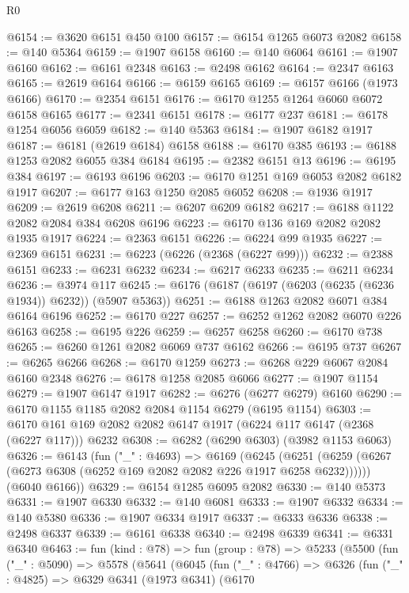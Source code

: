 \begin{lexlean}{R0}
\begin{coremodule}
@6154 := @3620 @6151 @450 @100
@6157 := @6154 @1265 @6073 @2082
@6158 := @140 @5364
@6159 := @1907 @6158
@6160 := @140 @6064
@6161 := @1907 @6160
@6162 := @6161 @2348
@6163 := @2498 @6162
@6164 := @2347 @6163
@6165 := @2619 @6164
@6166 := @6159 @6165
@6169 := @6157 @6166 (@1973 @6166)
@6170 := @2354 @6151
@6176 := @6170 @1255 @1264 @6060 @6072 @6158 @6165
@6177 := @2341 @6151
@6178 := @6177 @237
@6181 := @6178 @1254 @6056 @6059
@6182 := @140 @5363
@6184 := @1907 @6182 @1917
@6187 := @6181 (@2619 @6184) @6158
@6188 := @6170 @385
@6193 := @6188 @1253 @2082 @6055 @384 @6184
@6195 := @2382 @6151 @13
@6196 := @6195 @384
@6197 := @6193 @6196
@6203 := @6170 @1251 @169 @6053 @2082 @6182 @1917
@6207 := @6177 @163 @1250 @2085 @6052
@6208 := @1936 @1917
@6209 := @2619 @6208
@6211 := @6207 @6209 @6182
@6217 := @6188 @1122 @2082 @2084 @384 @6208 @6196
@6223 := @6170 @136 @169 @2082 @2082 @1935 @1917
@6224 := @2363 @6151
@6226 := @6224 @99 @1935
@6227 := @2369 @6151
@6231 := @6223 (@6226 (@2368 (@6227 @99)))
@6232 := @2388 @6151
@6233 := @6231 @6232
@6234 := @6217 @6233
@6235 := @6211 @6234
@6236 := @3974 @117
@6245 := @6176 (@6187 (@6197 (@6203 (@6235 (@6236 @1934)) @6232)) (@5907 @5363))
@6251 := @6188 @1263 @2082 @6071 @384 @6164 @6196
@6252 := @6170 @227
@6257 := @6252 @1262 @2082 @6070 @226 @6163
@6258 := @6195 @226
@6259 := @6257 @6258
@6260 := @6170 @738
@6265 := @6260 @1261 @2082 @6069 @737 @6162
@6266 := @6195 @737
@6267 := @6265 @6266
@6268 := @6170 @1259
@6273 := @6268 @229 @6067 @2084 @6160 @2348
@6276 := @6178 @1258 @2085 @6066
@6277 := @1907 @1154
@6279 := @1907 @6147 @1917
@6282 := @6276 (@6277 @6279) @6160
@6290 := @6170 @1155 @1185 @2082 @2084 @1154 @6279 (@6195 @1154)
@6303 := @6170 @161 @169 @2082 @2082 @6147 @1917 (@6224 @117 @6147 (@2368 (@6227 @117))) @6232
@6308 := @6282 (@6290 @6303) (@3982 @1153 @6063)
@6326 := @6143
    (fun ("_" : @4693) =>
    @6169
      (@6245 (@6251 (@6259 (@6267 (@6273 @6308 (@6252 @169 @2082 @2082 @226 @1917 @6258 @6232))))))
      (@6040 @6166))
@6329 := @6154 @1285 @6095 @2082
@6330 := @140 @5373
@6331 := @1907 @6330
@6332 := @140 @6081
@6333 := @1907 @6332
@6334 := @140 @5380
@6336 := @1907 @6334 @1917
@6337 := @6333 @6336
@6338 := @2498 @6337
@6339 := @6161 @6338
@6340 := @2498 @6339
@6341 := @6331 @6340
@6463 := fun (kind : @78) =>
  fun (group : @78) =>
  @5233
    (@5500
      (fun ("_" : @5090) =>
      @5578
        (@5641
          (@6045
            (fun ("_" : @4766) =>
            @6326
              (fun ("_" : @4825) =>
              @6329
                @6341
                (@1973 @6341)
                (@6170

\end{coremodule}
\end{lexlean}
